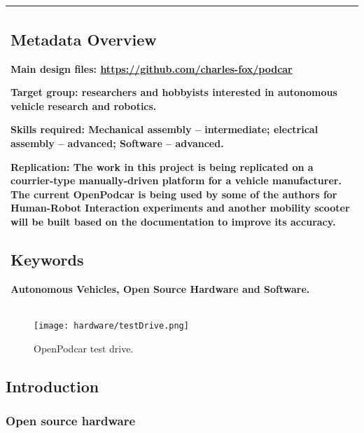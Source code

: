\documentclass[a4paper]{article}
\begin{document}
\begin{longtable}[]{@{}l@{}}
\begin{minipage}[t]{0.97\columnwidth}\raggedright\strut


\subsection{Metadata Overview}\label{h.akaipbqoqfs8}

Main design files: \url{https://github.com/charles-fox/podcar}

Target group: researchers and hobbyists interested in autonomous vehicle research and robotics. 

Skills required: Mechanical assembly – intermediate; electrical assembly – advanced; Software – advanced.

Replication: The work in this project is being replicated on a courrier-type manually-driven platform for a vehicle manufacturer. The current OpenPodcar is being used by some of the authors for Human-Robot Interaction experiments and another mobility scooter will be built based on the documentation to improve its accuracy.



\subsection{Keywords}\label{h.kdz351yp7g7c}

{Autonomous Vehicles, Open Source Hardware and Software.}

\strut\end{minipage}\tabularnewline
\bottomrule
\end{longtable}

\begin{figure}[h]
	\texttt{[image: hardware/testDrive.png]}
	\caption{OpenPodcar test drive.}
	\label{fig:testDrive}
\end{figure}


\subsection{Introduction}\label{h.pnj38xyr5dyy}


\subsubsection{Open source hardware}
\end{document}

